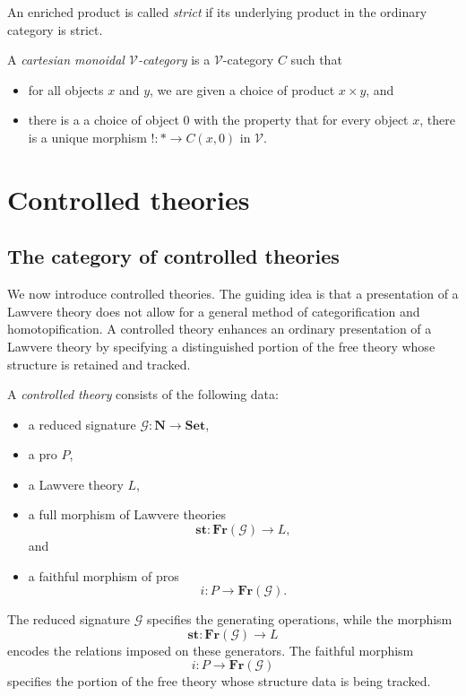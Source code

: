 \documentclass{tac}
\begin{document}
\begin{definition}
An enriched product is called \emph{strict} if its underlying product in the
ordinary category is strict.
\end{definition}

\begin{definition}
A  \emph{cartesian monoidal $\mathcal{V}$-category} is a $\mathcal V$-category $C$ such that
\begin{itemize}
    \item for all objects $x$ and $y$, we are given a choice of product $x\times y$, and
    \item there is a a choice of object $0$ with the property that for every object $x$, there is a unique morphism $!:*\to C(x,0)$ in $\mathcal V$.
\end{itemize}
\end{definition}

\section{Controlled theories}
\subsection*{The category of controlled theories}
We now introduce controlled theories. The guiding
idea is that a presentation of a Lawvere theory does not allow for a general method of categorification and homotopification. A
controlled theory enhances an ordinary presentation of a Lawvere theory by specifying a
distinguished portion of the free theory whose structure is retained and
tracked.
\begin{definition}\label{def_of_cont_th}
A \emph{controlled theory} consists of the following data:
\begin{itemize}
    \item a reduced signature $\mathcal{G}:\mathbf{N}\to\mathbf{Set}$,
    \item a pro $P$,
    \item a Lawvere theory $L$,
    \item a full morphism of Lawvere theories
    \[
    \mathbf{st}:\mathbf{Fr}(\mathcal{G})\to L,
    \]
    and
    \item a faithful morphism of pros
    \[
    i:P\to\mathbf{Fr}(\mathcal{G}).
    \]
\end{itemize}
\end{definition}

The reduced signature $\mathcal{G}$ specifies the generating operations, while
the morphism
\[
\mathbf{st}:\mathbf{Fr}(\mathcal{G})\to L
\]
encodes the relations imposed on these generators. The faithful morphism
\[
i:P\to\mathbf{Fr}(\mathcal{G})
\]
specifies the portion of the free theory whose structure data is being
tracked.
\end{document}
